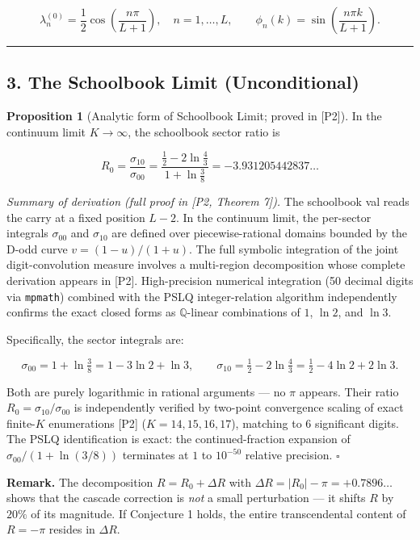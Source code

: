 \documentclass[
  11pt,
]{article}
\begin{document}
\[\lambda_n^{(0)} = \frac{1}{2}\cos\!\left(\frac{n\pi}{L+1}\right), \quad n = 1, \ldots, L, \qquad \phi_n(k) = \sin\!\left(\frac{n\pi k}{L+1}\right).\]

\begin{center}\rule{0.5\linewidth}{0.5pt}\end{center}

\newpage

\subsection{3. The Schoolbook Limit
(Unconditional)}\label{the-schoolbook-limit-unconditional}

\textbf{Proposition 1} (Analytic form of Schoolbook Limit; proved in {[}P2{]}).
In the continuum limit \(K \to \infty\), the schoolbook sector ratio is

\[R_0 = \frac{\sigma_{10}}{\sigma_{00}} = \frac{\tfrac{1}{2} - 2\ln\tfrac{4}{3}}{1 + \ln\tfrac{3}{8}} = -3.931205442837\ldots\]

\emph{Summary of derivation (full proof in {[}P2, Theorem 7{]}).} The schoolbook
val reads the carry at a fixed position \(L - 2\). In the continuum limit, the
per-sector integrals \(\sigma_{00}\) and \(\sigma_{10}\) are defined over
piecewise-rational domains bounded by the D-odd curve \(v = (1-u)/(1+u)\). The
full symbolic integration of the joint digit-convolution measure involves a
multi-region decomposition whose complete derivation appears in {[}P2{]}.
High-precision numerical integration (50 decimal digits via \texttt{mpmath})
combined with the PSLQ integer-relation algorithm independently confirms the
exact closed forms as \(\mathbb{Q}\)-linear combinations of \(1\), \(\ln 2\),
and \(\ln 3\).

Specifically, the sector integrals are:

\[\sigma_{00} = 1 + \ln\tfrac{3}{8} = 1 - 3\ln 2 + \ln 3, \qquad \sigma_{10} = \tfrac{1}{2} - 2\ln\tfrac{4}{3} = \tfrac{1}{2} - 4\ln 2 + 2\ln 3.\]

Both are purely logarithmic in rational arguments --- no \(\pi\) appears. Their
ratio \(R_0 = \sigma_{10}/\sigma_{00}\) is independently verified by two-point
convergence scaling of exact finite-\(K\) enumerations {[}P2{]}
(\(K = 14, 15, 16, 17\)), matching to 6 significant digits. The PSLQ
identification is exact: the continued-fraction expansion of
\(\sigma_{00}/(1 + \ln(3/8))\) terminates at \(1\) to \(10^{-50}\) relative
precision. \(\square\)

\textbf{Remark.} The decomposition \(R = R_0 + \Delta R\) with
\(\Delta R = |R_0| - \pi = +0.7896\ldots\) shows that the cascade correction is
\emph{not} a small perturbation --- it shifts \(R\) by \(20\%\) of its
magnitude. If Conjecture 1 holds, the entire transcendental content of
\(R = -\pi\) resides in \(\Delta R\).
\end{document}
